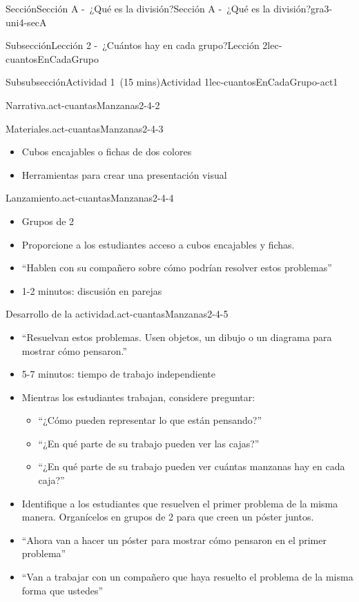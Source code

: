 \documentclass[oneside,10pt,]{article}
\begin{document}
\begin{sectionptx}{Sección}{Sección A -~¿Qué es la división?}{}{Sección A -~¿Qué es la división?}{}{}{gra3-uni4-secA}
\begin{subsectionptx}{Subsección}{Lección 2 -~¿Cuántos hay en cada grupo?}{}{Lección 2}{}{}{lec-cuantosEnCadaGrupo}
\begin{subsubsectionptx}{Subsubsección}{Actividad 1~(15 mins)}{}{Actividad 1}{}{}{lec-cuantosEnCadaGrupo-act1}
\begin{paragraphs}{Narrativa.}{act-cuantasManzanas2-4-2}
\begin{itemize}[label=\textbullet]
\end{itemize}
\end{paragraphs}%
\begin{paragraphs}{Materiales.}{act-cuantasManzanas2-4-3}%
%
\begin{itemize}[label=\textbullet]
\item{}Cubos encajables o fichas de dos colores%
\item{}Herramientas para crear una presentación visual%
\end{itemize}
\end{paragraphs}%
\begin{paragraphs}{Lanzamiento.}{act-cuantasManzanas2-4-4}%
%
\begin{itemize}[label=\textbullet]
\item{}Grupos de 2%
\item{}Proporcione a los estudiantes acceso a cubos encajables y fichas.%
\item{}``Hablen con su compañero sobre cómo podrían resolver estos problemas''%
\item{}1-2 minutos: discusión en parejas%
\end{itemize}
\end{paragraphs}%
\begin{paragraphs}{Desarrollo de la actividad.}{act-cuantasManzanas2-4-5}%
%
\begin{itemize}[label=\textbullet]
\item{}``Resuelvan estos problemas. Usen objetos, un dibujo o un diagrama para mostrar cómo pensaron.''%
\item{}5-7 minutos: tiempo de trabajo independiente%
\item{}Mientras los estudiantes trabajan, considere preguntar:%
\begin{itemize}[label=$\circ$]
\item{}``¿Cómo pueden representar lo que están pensando?''%
\item{}``¿En qué parte de su trabajo pueden ver las cajas?''%
\item{}``¿En qué parte de su trabajo pueden ver cuántas manzanas hay en cada caja?''%
\end{itemize}
%
\item{}Identifique a los estudiantes que resuelven el primer problema de la misma manera. Organícelos en grupos de 2 para que creen un póster juntos.%
\item{}``Ahora van a hacer un póster para mostrar cómo pensaron en el primer problema''%
\item{}``Van a trabajar con un compañero que haya resuelto el problema de la misma forma que ustedes''%

\end{itemize}
\end{paragraphs}
\end{subsubsectionptx}
\end{subsectionptx}
\end{sectionptx}
\end{document}
